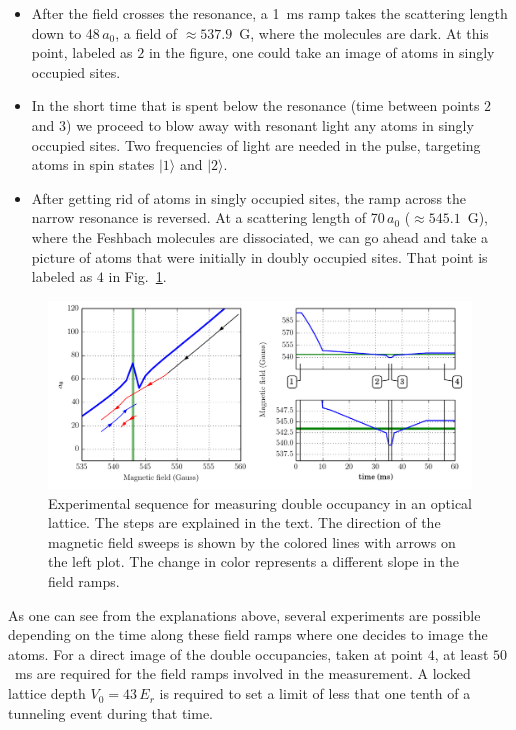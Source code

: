 \begin{itemize}
\item After the field crosses the resonance, a 1~ms ramp takes the scattering
length down to 48\,$a_{0}$,  a field of $\approx 537.9$~G,  where the molecules
are dark.   At this point, labeled as $\boxed{2}$ in the figure, one could take
an image of atoms in singly occupied sites.  


\item In the short time that is spent below the resonance (time between points
$\boxed{2}$ and $\boxed{3}$) we proceed to blow away with resonant light any
atoms in singly occupied sites.  Two frequencies of light are needed in the
pulse, targeting atoms in spin states $|1\rangle$ and $|2\rangle$. 

\item After getting rid of atoms in singly occupied sites, the ramp across the
narrow resonance is reversed.  At a scattering length of 70\,$a_{0}$ ($\approx
545.1$~G), where the Feshbach molecules are dissociated, we can go ahead and
take a picture of atoms that were initially in doubly occupied sites.  That
point is labeled as $\boxed{4}$ in Fig.~\ref{fig:measure-doub}. 
\end{itemize}  
\begin{figure}
\centering
\includegraphics[width=\textwidth]{../figures/double_occ/narrowfr_sweeps2.png}
\caption[Double occupancy measurement]{Experimental sequence for measuring
double occupancy in an optical lattice.  The steps are explained in the text.
The direction of the magnetic field sweeps is shown by the colored lines with
arrows on the left plot. The change in color represents a different slope in
the field ramps.  } 
\label{fig:measure-doub}
\end{figure}

As one can see from the explanations above, several experiments are possible
depending on the time along these field ramps where one decides to image the
atoms.  For a direct image of the double occupancies, taken at point
$\boxed{4}$, at least $50$~ms are required for the field ramps involved in the
measurement. A locked lattice depth $V_{0}=43\,E_{r}$ is required to set a
limit of less that one tenth of a tunneling event during that time.

